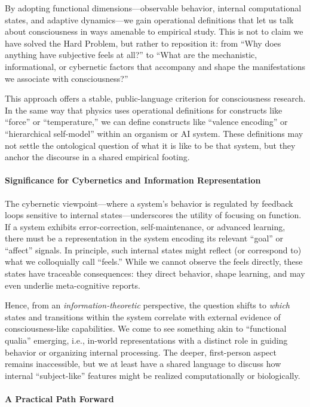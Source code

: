 \documentclass[12pt]{article}
\begin{document}
By adopting functional dimensions---observable behavior, internal computational states, and adaptive dynamics---we gain operational definitions that let us talk about consciousness in ways amenable to empirical study. This is not to claim we have solved the Hard Problem, but rather to reposition it: from ``Why does anything have subjective feels at all?'' to ``What are the mechanistic, informational, or cybernetic factors that accompany and shape the manifestations we associate with consciousness?''

This approach offers a stable, public-language criterion for consciousness research. In the same way that physics uses operational definitions for constructs like ``force'' or ``temperature,'' we can define constructs like ``valence encoding'' or ``hierarchical self-model'' within an organism or AI system. These definitions may not settle the ontological question of what it is like to be that system, but they anchor the discourse in a shared empirical footing.

\paragraph{Significance for Cybernetics and Information Representation}

The cybernetic viewpoint---where a system's behavior is regulated by feedback loops sensitive to internal states---underscores the utility of focusing on function. If a system exhibits error-correction, self-maintenance, or advanced learning, there must be a representation in the system encoding its relevant ``goal'' or ``affect'' signals. In principle, such internal states might reflect (or correspond to) what we colloquially call ``feels.'' While we cannot observe the feels directly, these states have traceable consequences: they direct behavior, shape learning, and may even underlie meta-cognitive reports.

Hence, from an \textit{information-theoretic} perspective, the question shifts to \textit{which} states and transitions within the system correlate with external evidence of consciousness-like capabilities. We come to see something akin to ``functional qualia'' emerging, i.e., in-world representations with a distinct role in guiding behavior or organizing internal processing. The deeper, first-person aspect remains inaccessible, but we at least have a shared language to discuss how internal ``subject-like'' features might be realized computationally or biologically.

\paragraph{A Practical Path Forward}
\end{document}
